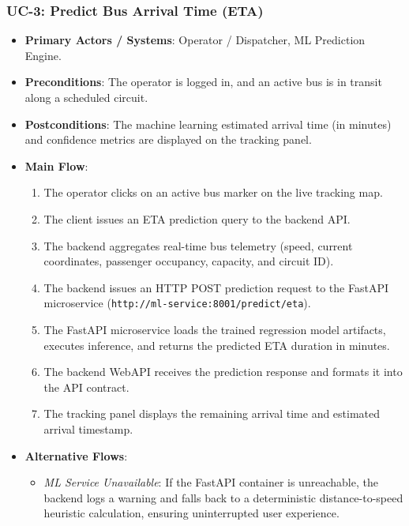 \subsubsection{UC-3: Predict Bus Arrival Time (ETA)}
\begin{itemize}
  \item \textbf{Primary Actors / Systems}: Operator / Dispatcher, ML Prediction Engine.
  \item \textbf{Preconditions}: The operator is logged in, and an active bus is in transit along a scheduled circuit.
  \item \textbf{Postconditions}: The machine learning estimated arrival time (in minutes) and confidence metrics are displayed on the tracking panel.
  \item \textbf{Main Flow}:
  \begin{enumerate}
    \item The operator clicks on an active bus marker on the live tracking map.
    \item The client issues an ETA prediction query to the backend API.
    \item The backend aggregates real-time bus telemetry (speed, current coordinates, passenger occupancy, capacity, and circuit ID).
    \item The backend issues an HTTP POST prediction request to the FastAPI microservice (\texttt{http://ml-service:8001/predict/eta}).
    \item The FastAPI microservice loads the trained regression model artifacts, executes inference, and returns the predicted ETA duration in minutes.
    \item The backend WebAPI receives the prediction response and formats it into the API contract.
    \item The tracking panel displays the remaining arrival time and estimated arrival timestamp.
  \end{enumerate}
  \item \textbf{Alternative Flows}:
  \begin{itemize}
    \item \emph{ML Service Unavailable}: If the FastAPI container is unreachable, the backend logs a warning and falls back to a deterministic distance-to-speed heuristic calculation, ensuring uninterrupted user experience.
  \end{itemize}
\end{itemize}


